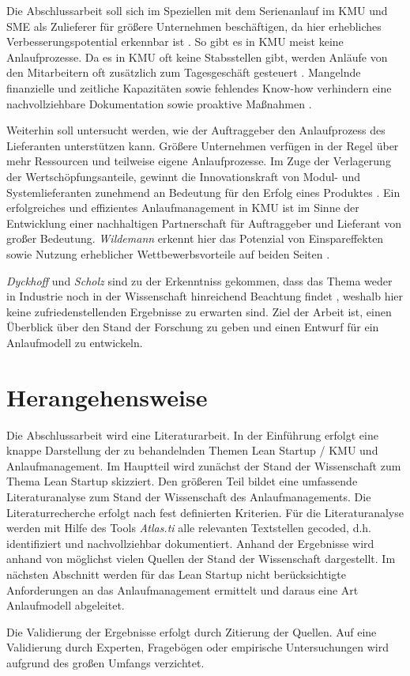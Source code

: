 \documentclass[%
a4paper,
aps,
pra,
 longbibliography,
 lengthcheck,%
]{revtex4-1}
\begin{document}
Die Abschlussarbeit soll sich im Speziellen mit dem Serienanlauf im KMU und SME als Zulieferer für größere Unternehmen beschäftigen, da hier erhebliches Verbesserungspotential erkennbar ist \cite[S.18]{Dombrowski2009a}. So gibt es in KMU meist keine Anlaufprozesse. Da es in KMU oft keine Stabsstellen gibt, werden Anläufe von den Mitarbeitern oft zusätzlich zum Tagesgeschäft gesteuert \cite{Dombrowski2009}. %
Mangelnde finanzielle und zeitliche Kapazitäten sowie fehlendes Know-how verhindern eine nachvollziehbare Dokumentation sowie proaktive Maßnahmen \cite{Zimolong2006,Dombrowski2009a}. 

Weiterhin soll untersucht werden, wie der Auftraggeber den Anlaufprozess des Lieferanten unterstützen kann. Größere Unternehmen verfügen in der Regel über mehr Ressourcen und teilweise eigene Anlaufprozesse. Im Zuge der Verlagerung der Wertschöpfungsanteile, gewinnt die Innovationskraft von Modul- und Systemlieferanten zunehmend an Bedeutung für den Erfolg eines Produktes \cite{Kuhn2002}. Ein erfolgreiches und effizientes Anlaufmanagement in KMU ist im Sinne der Entwicklung einer nachhaltigen Partnerschaft für Auftraggeber und Lieferant von großer Bedeutung. \textit{Wildemann} erkennt hier das Potenzial von Einspareffekten sowie Nutzung erheblicher Wettbewerbsvorteile auf beiden Seiten \cite{Wildemann2008}.

\textit{Dyckhoff} und \textit{Scholz} sind zu der Erkenntniss gekommen, dass das Thema weder in Industrie noch in der Wissenschaft hinreichend Beachtung findet \cite{Dyckhoff2012, Scholz2010}, weshalb hier keine zufriedenstellenden Ergebnisse zu erwarten sind.
Ziel der Arbeit ist, einen Überblick über den Stand der Forschung zu geben und einen Entwurf für ein Anlaufmodell zu entwickeln. 

\section{Herangehensweise}
Die Abschlussarbeit wird eine Literaturarbeit. In der Einführung erfolgt eine knappe Darstellung der zu behandelnden Themen Lean Startup / KMU und Anlaufmanagement. Im Hauptteil wird zunächst der Stand der Wissenschaft zum Thema Lean Startup skizziert. Den größeren Teil bildet eine umfassende Literaturanalyse zum Stand der Wissenschaft des Anlaufmanagements. Die Literaturrecherche erfolgt nach fest definierten Kriterien. Für die Literaturanalyse werden mit Hilfe des Tools \textit{Atlas.ti} alle relevanten Textstellen gecoded, d.h. identifiziert und nachvollziehbar dokumentiert. Anhand der  Ergebnisse wird anhand von möglichst vielen Quellen der Stand der Wissenschaft dargestellt. Im nächsten Abschnitt werden für das Lean Startup nicht berücksichtigte Anforderungen an das Anlaufmanagement ermittelt und daraus eine Art Anlaufmodell abgeleitet. 

Die Validierung der Ergebnisse erfolgt durch Zitierung der Quellen. Auf eine Validierung durch Experten, Fragebögen oder empirische Untersuchungen wird aufgrund des großen Umfangs verzichtet. 

\vspace{1cm}

\end{document}
